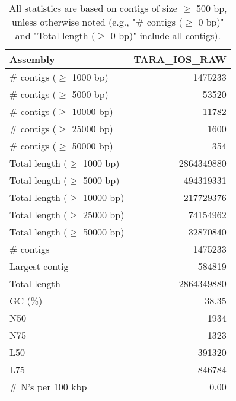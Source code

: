 \documentclass[12pt,a4paper]{article}
\begin{document}
\begin{table}[ht]
\begin{center}
\caption{All statistics are based on contigs of size $\geq$ 500 bp, unless otherwise noted (e.g., "\# contigs ($\geq$ 0 bp)" and "Total length ($\geq$ 0 bp)" include all contigs).}
\begin{tabular}{|l*{1}{|r}|}
\hline
Assembly & TARA\_IOS\_RAW \\ \hline
\# contigs ($\geq$ 1000 bp) & 1475233 \\ \hline
\# contigs ($\geq$ 5000 bp) & 53520 \\ \hline
\# contigs ($\geq$ 10000 bp) & 11782 \\ \hline
\# contigs ($\geq$ 25000 bp) & 1600 \\ \hline
\# contigs ($\geq$ 50000 bp) & 354 \\ \hline
Total length ($\geq$ 1000 bp) & 2864349880 \\ \hline
Total length ($\geq$ 5000 bp) & 494319331 \\ \hline
Total length ($\geq$ 10000 bp) & 217729376 \\ \hline
Total length ($\geq$ 25000 bp) & 74154962 \\ \hline
Total length ($\geq$ 50000 bp) & 32870840 \\ \hline
\# contigs & 1475233 \\ \hline
Largest contig & 584819 \\ \hline
Total length & 2864349880 \\ \hline
GC (\%) & 38.35 \\ \hline
N50 & 1934 \\ \hline
N75 & 1323 \\ \hline
L50 & 391320 \\ \hline
L75 & 846784 \\ \hline
\# N's per 100 kbp & 0.00 \\ \hline
\end{tabular}
\end{center}
\end{table}
\end{document}
